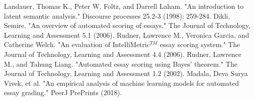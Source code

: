 \documentclass[rnd]{mas_report}
\begin{document}
\begin{thebibliography}{3}
 Landauer, Thomas K., Peter W. Foltz, and Darrell Laham. "An introduction to latent semantic analysis." Discourse processes 25.2-3 (1998): 259-284.
 Dikli, Semire. "An overview of automated scoring of essays." The Journal of Technology, Learning and Assessment 5.1 (2006).
 Rudner, Lawrence M., Veronica Garcia, and Catherine Welch. "An evaluation of IntelliMetric$^{TM}$ essay scoring system." The Journal of Technology, Learning and Assessment 4.4 (2006).
 Rudner, Lawrence M., and Tahung Liang. "Automated essay scoring using Bayes' theorem." The Journal of Technology, Learning and Assessment 1.2 (2002).
 Madala, Deva Surya Vivek, et al. "An empirical analysis of machine learning models for automated essay grading." PeerJ PrePrints (2018).


\end{thebibliography}
\end{document}
